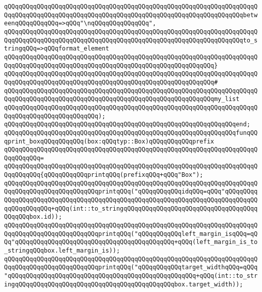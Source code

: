 \verb|qQQqqQQqqQQqqQQqqQQqqQQqqQQqqQQqqQQqqQQqqQQqqQQqqQQqqQQqqQQqqQQqqQQqqQQqqQQqqQQqqQQqqQQqqQQqqQQqqQQqqQQqqQQqqQQqqQQqqQQqqQQqqQQqqQQqqQQqbetweenqQQqqQQqqQQq=>qQQq"\nqQQqqQQqqQQqqQQq",|\newline
\verb|qQQqqQQqqQQqqQQqqQQqqQQqqQQqqQQqqQQqqQQqqQQqqQQqqQQqqQQqqQQqqQQqqQQqqQQqqQQqqQQqqQQqqQQqqQQqqQQqqQQqqQQqqQQqqQQqqQQqqQQqqQQqqQQqqQQqqQQqto_stringqQQq=>qQQqformat_element|\newline
\verb|qQQqqQQqqQQqqQQqqQQqqQQqqQQqqQQqqQQqqQQqqQQqqQQqqQQqqQQqqQQqqQQqqQQqqQQqqQQqqQQqqQQqqQQqqQQqqQQqqQQqqQQqqQQqqQQqqQQqqQQqqQQqqQQq}|\newline
\verb|qQQqqQQqqQQqqQQqqQQqqQQqqQQqqQQqqQQqqQQqqQQqqQQqqQQqqQQqqQQqqQQqqQQqqQQqqQQqqQQqqQQqqQQqqQQqqQQqqQQqqQQqqQQqqQQqqQQqqQQqqQQqqQQq#|\newline
\verb|qQQqqQQqqQQqqQQqqQQqqQQqqQQqqQQqqQQqqQQqqQQqqQQqqQQqqQQqqQQqqQQqqQQqqQQqqQQqqQQqqQQqqQQqqQQqqQQqqQQqqQQqqQQqqQQqqQQqqQQqqQQqqQQqmy_list|\newline
\verb|qQQqqQQqqQQqqQQqqQQqqQQqqQQqqQQqqQQqqQQqqQQqqQQqqQQqqQQqqQQqqQQqqQQqqQQqqQQqqQQqqQQqqQQqqQQqqQQq);|\newline
\verb|qQQqqQQqqQQqqQQqqQQqqQQqqQQqqQQqqQQqqQQqqQQqqQQqqQQqqQQqqQQqqQQqend;|\newline
\newline
\verb|qQQqqQQqqQQqqQQqqQQqqQQqqQQqqQQqqQQqqQQqqQQqqQQqqQQqqQQqqQQqqQQqfunqQQqprint_boxqQQqqQQqqQQq(box:qQQqtyp::Box)qQQqqQQqqQQqprefix|\newline
\verb|qQQqqQQqqQQqqQQqqQQqqQQqqQQqqQQqqQQqqQQqqQQqqQQqqQQqqQQqqQQqqQQqqQQqqQQqqQQqqQQq=|\newline
\verb|qQQqqQQqqQQqqQQqqQQqqQQqqQQqqQQqqQQqqQQqqQQqqQQqqQQqqQQqqQQqqQQqqQQqqQQqqQQqqQQq{qQQqqQQqqQQqprintqQQq(prefixqQQq+qQQq"Box");|\newline
\verb|qQQqqQQqqQQqqQQqqQQqqQQqqQQqqQQqqQQqqQQqqQQqqQQqqQQqqQQqqQQqqQQqqQQqqQQqqQQqqQQqqQQqqQQqqQQqqQQqprintqQQq("qQQqqQQqqQQqidqQQq=qQQq"qQQqqQQqqQQqqQQqqQQqqQQqqQQqqQQqqQQqqQQqqQQqqQQqqQQqqQQqqQQqqQQqqQQqqQQqqQQqqQQqqQQqqQQqqQQq+qQQq(int::to_stringqQQqqQQqqQQqqQQqqQQqqQQqqQQqqQQqqQQqqQQqqQQqbox.id));|\newline
\verb|qQQqqQQqqQQqqQQqqQQqqQQqqQQqqQQqqQQqqQQqqQQqqQQqqQQqqQQqqQQqqQQqqQQqqQQqqQQqqQQqqQQqqQQqqQQqqQQqprintqQQq("qQQqqQQqqQQqleft_margin_isqQQq=qQQq"qQQqqQQqqQQqqQQqqQQqqQQqqQQqqQQqqQQqqQQqqQQq+qQQq(left_margin_is_to_stringqQQqbox.left_margin_is));|\newline
\verb|qQQqqQQqqQQqqQQqqQQqqQQqqQQqqQQqqQQqqQQqqQQqqQQqqQQqqQQqqQQqqQQqqQQqqQQqqQQqqQQqqQQqqQQqqQQqqQQqprintqQQq("qQQqqQQqqQQqtarget_widthqQQq=qQQq"qQQqqQQqqQQqqQQqqQQqqQQqqQQqqQQqqQQqqQQqqQQqqQQqqQQq+qQQq(int::to_stringqQQqqQQqqQQqqQQqqQQqqQQqqQQqqQQqqQQqqQQqqQQqbox.target_width));|\newline
